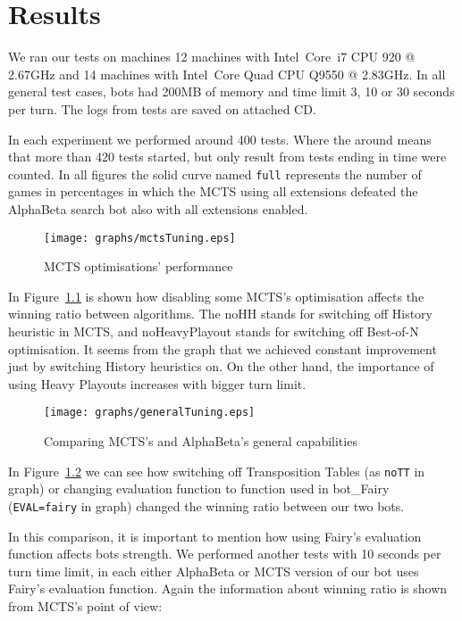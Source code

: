 \chapter{Results}
We ran our tests on machines 12 machines with
Intel\textregistered~Core\texttrademark~i7 CPU 920  @ 2.67GHz and 14 machines
with Intel\textregistered~Core Quad CPU Q9550 @ 2.83GHz. In all
general test cases, bots had 200MB of memory and time limit 3, 10 or 30 seconds
per turn. The logs from tests are saved on attached CD.

In each experiment we performed around 400 tests. Where the around means that
more than 420 tests started, but only result from tests ending in time were
counted. In all figures the solid curve named \texttt{full} represents the
number of games in percentages in which the MCTS using all extensions defeated
the AlphaBeta search bot also with all extensions enabled.

\begin{figure}[htb]
	\centering
	\texttt{[image: graphs/mctsTuning.eps]}
	\caption{MCTS optimisations' performance}
	\label{pic:mctsTuning}
\end{figure}

In Figure~\ref{pic:mctsTuning} is shown how disabling some MCTS's
optimisation affects the winning ratio between algorithms. The noHH stands for
switching off History heuristic in MCTS, and noHeavyPlayout stands for
switching off Best-of-N optimisation. It seems from the graph that we achieved
constant improvement just by switching History heuristics on. On the other
hand, the importance of using Heavy Playouts increases with bigger turn limit.

\begin{figure}[htb]
	\centering
	\texttt{[image: graphs/generalTuning.eps]}
	\caption{Comparing MCTS's and AlphaBeta's general capabilities}
	\label{pic:generalTuning}
\end{figure}

In Figure~\ref{pic:generalTuning} we can see how switching off Transposition
Tables (as \texttt{noTT} in graph) or changing evaluation function to function
used in bot\_Fairy (\texttt{EVAL=fairy} in graph) changed the winning ratio
between our two bots.

In this comparison, it is important to mention how using Fairy's evaluation
function affects bots strength. We performed another tests with 10 seconds per
turn time limit, in each either AlphaBeta or MCTS version of our bot uses
Fairy's evaluation function. Again the information about winning ratio is shown
from MCTS's point of view:


